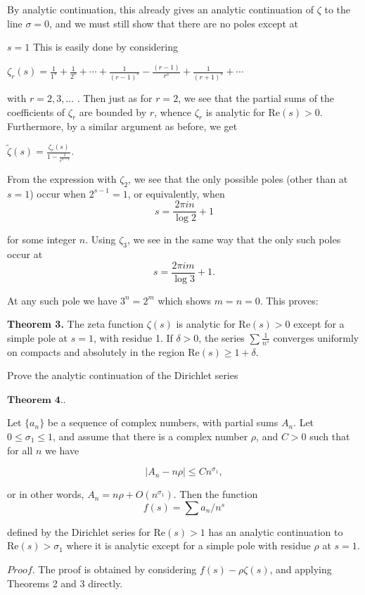 By analytic continuation, this already gives an analytic continuation of \(\zeta\) to the line \(\sigma = 0\), 
and we must still show that there are no poles except at

\( s = 1\) This is easily done by considering

\( \zeta_r(s) = \frac{1}{1^s} + \frac{1}{2^s} + \cdots + \frac{1}{(r-1)^s} - \frac{(r-1)}{r^s} + \frac{1}{(r+1)^s} + \cdots \)

with \( r = 2, 3, \ldots\) . Then just as for \( r = 2 \), we see that the partial sums of the coefficients of \( \zeta_r \) are bounded by \( r \), 
whence \( \zeta_r \) is analytic for \( \text{Re}(s) > 0 \). Furthermore, by a similar argument as before, we get

\( \widetilde{\zeta}(s) = \frac{\zeta_r(s)}{1 - \frac{1}{r^{s-1}}} \).

From the expression with \(\zeta_2\), we see that the only possible poles (other than at \(s = 1\)) occur when \(2^{s-1} = 1\), or equivalently, when
\[ s = \frac{2\pi in}{\log 2} + 1 \]

for some integer \(n\). Using \(\zeta_3\), we see in the same way that the only such poles occur at
\[ s = \frac{2\pi im}{\log 3} + 1. \]

At any such pole we have \(3^n = 2^m\) which shows \(m = n = 0\). This proves:

\textbf{Theorem 3.} The zeta function \(\zeta(s)\) is analytic for \(\text{Re}(s) > 0\) except for a simple pole at \(s = 1\), with residue 1. 
If \(\delta > 0\), the series \(\sum \frac{1}{n^s}\) converges uniformly on compacts and absolutely in the region \(\text{Re}(s) \geq 1 + \delta\).

Prove the analytic continuation of the Dirichlet series

\( \textbf{Theorem 4.} \). 

Let \(\{a_n\}\) be a sequence of complex numbers, with partial sums \(A_n\). 
Let \(0 \leq \sigma_1 \leq 1\), and assume that there is a complex number \(\rho\), and \(C > 0\) such that for all \(n\) we have

\[
|A_n - n\rho| \leq Cn^{\sigma_1},
\]

or in other words, \(A_n = n\rho + O(n^{\sigma_1})\). 
Then the function
\[
f(s) = \sum a_n/n^s
\]

defined by the Dirichlet series for \(\text{Re}(s) > 1\) has an analytic continuation to \(\text{Re}(s) > \sigma_1\) where it is analytic 
except for a simple pole with residue \(\rho\) at \(s = 1\).

\( \textit{Proof.} \) 
The proof is obtained by considering \(f(s) - \rho\zeta(s)\), and applying Theorems 2 and 3 directly.
